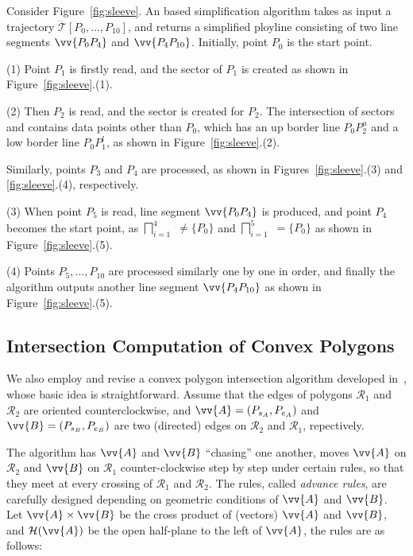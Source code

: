 \begin{example}
\label{exm-alg-sleeve}
Consider Figure~\ref{fig:sleeve}. An \cia based simplification algorithm takes as input a trajectory $\dddot{\mathcal{T}}[P_0, \ldots, P_{10}]$, and returns a simplified ployline consisting of two line segments $\vv{P_0P_4}$ and  $\vv{P_4P_{10}}$. Initially, point $P_0$ is the start point.

\sstab(1) Point $P_1$ is firstly read, and the sector  of $P_1$ is created as shown in Figure~\ref{fig:sleeve}.(1).

\sstab(2) Then $P_2$ is read, and the sector   is created for $P_2$. The intersection of sectors  and   contains data points other than $P_0$,  which has an up border line $P_0P_2^u$ and a low border line $P_0P_1^l$, as shown in Figure~\ref{fig:sleeve}.(2).

Similarly, points $P_3$ and $P_4$ are processed, as shown in Figures~\ref{fig:sleeve}.(3) and \ref{fig:sleeve}.(4), respectively.

\sstab(3) When point $P_5$ is read,  line segment $\vv{P_0P_4}$ is produced, and point $P_4$ becomes the start point, as $\bigsqcap_{i=1}^{4}$ $\ne\{P_0\}$ and $\bigsqcap_{i=1}^{5}$ $=\{P_0\}$ as shown in Figure~\ref{fig:sleeve}.(5).


\sstab(4) Points $P_5, \ldots, P_{10}$ are processed similarly one by one in order, and finally the algorithm outputs another line segment $\vv{P_4P_{10}}$ as shown in Figure~\ref{fig:sleeve}.(5). \eop
\end{example}




\subsection{Intersection Computation of Convex Polygons}
\label{subsec-cpi}

We also employ and revise a convex polygon intersection algorithm developed in~\cite{ORourke:Intersection}, whose basic idea is straightforward.
Assume \kwlog that the edges of polygons $\mathcal{R}_1$ and $\mathcal{R}_2$ are oriented counterclockwise, and $\vv{A} = (P_{s_A}, P_{e_A})$ and $\vv{B} = (P_{s_B}, P_{e_B})$ are two (directed) edges on $\mathcal{R}_2$ and $\mathcal{R}_1$, repectively.


The algorithm has $\vv{A}$ and $\vv{B}$ ``chasing'' one another, \ie moves $\vv{A}$ on $\mathcal{R}_2$ and $\vv{B}$ on $\mathcal{R}_1$ counter-clockwise step by step under certain rules, so that they meet at every crossing of $\mathcal{R}_1$ and $\mathcal{R}_2$.
%
The rules, called \emph{advance rules}, are carefully designed depending on geometric conditions of $\vv{A}$ and $\vv{B}$.
Let $\vv{A} \times \vv{B}$ be the cross product of (vectors) $\vv{A}$ and $\vv{B}$, and $\mathcal{H}(\vv{A})$ be the open half-plane to the left of $\vv{A}$, the rules are as follows:

